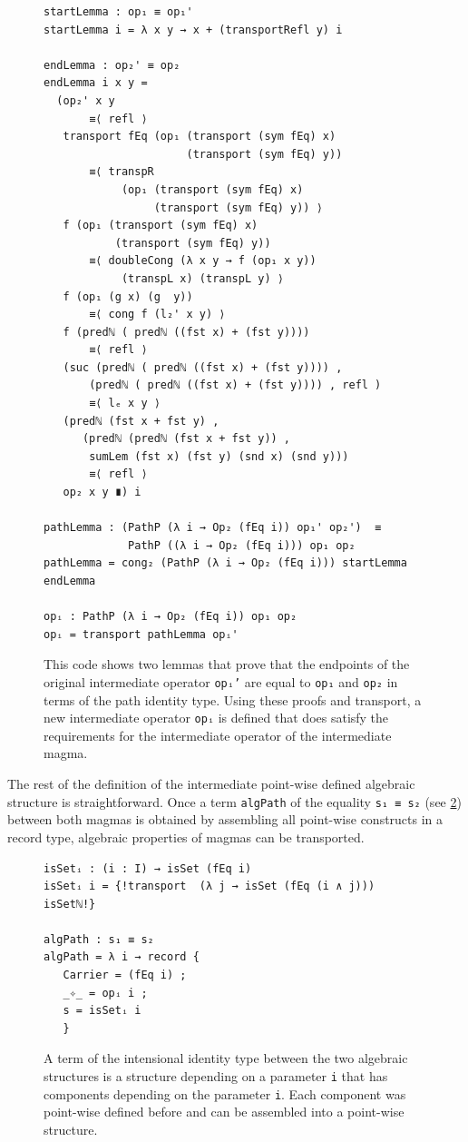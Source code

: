 \documentclass[12pt,a4paper,twoside,xetex]{book}
\begin{document}
\begin{figure}\label{adaptedOp}
 \centering
\begin{BVerbatim}
startLemma : op₁ ≡ op₁'
startLemma i = λ x y → x + (transportRefl y) i

endLemma : op₂' ≡ op₂
endLemma i x y =
  (op₂' x y
       ≡⟨ refl ⟩
   transport fEq (op₁ (transport (sym fEq) x) 
                      (transport (sym fEq) y))
       ≡⟨ transpR 
            (op₁ (transport (sym fEq) x) 
                 (transport (sym fEq) y)) ⟩
   f (op₁ (transport (sym fEq) x) 
           (transport (sym fEq) y))
       ≡⟨ doubleCong (λ x y → f (op₁ x y)) 
            (transpL x) (transpL y) ⟩
   f (op₁ (g x) (g  y))
       ≡⟨ cong f (l₂' x y) ⟩
   f (predℕ ( predℕ ((fst x) + (fst y))))
       ≡⟨ refl ⟩
   (suc (predℕ ( predℕ ((fst x) + (fst y)))) , 
       (predℕ ( predℕ ((fst x) + (fst y)))) , refl )
       ≡⟨ lₑ x y ⟩
   (predℕ (fst x + fst y) , 
      (predℕ (predℕ (fst x + fst y)) , 
       sumLem (fst x) (fst y) (snd x) (snd y)))
       ≡⟨ refl ⟩
   op₂ x y ∎) i

pathLemma : (PathP (λ i → Op₂ (fEq i)) op₁' op₂')  ≡  
             PathP ((λ i → Op₂ (fEq i))) op₁ op₂
pathLemma = cong₂ (PathP (λ i → Op₂ (fEq i))) startLemma endLemma

opᵢ : PathP (λ i → Op₂ (fEq i)) op₁ op₂
opᵢ = transport pathLemma opᵢ'
\end{BVerbatim}

\caption{This code shows two lemmas that prove that the endpoints of the original intermediate operator \texttt{opᵢ'} are equal to \texttt{op₁} and \texttt{op₂} in terms of the path identity type. Using these proofs and transport, a new intermediate operator \texttt{opᵢ} is defined that does satisfy the requirements for the intermediate operator of the intermediate magma.}   
\end{figure}

The rest of the definition of the intermediate point-wise defined algebraic structure is straightforward. Once a term \texttt{algPath} of the equality \texttt{s₁ ≡ s₂} (see \cref{algpath}) between both magmas is obtained by assembling all point-wise constructs in a record type, algebraic properties of magmas can be transported.  

\begin{figure}\label{algpath}
 \begin{BVerbatim}
isSetᵢ : (i : I) → isSet (fEq i)
isSetᵢ i = {!transport  (λ j → isSet (fEq (i ∧ j))) isSetℕ!} 

algPath : s₁ ≡ s₂
algPath = λ i → record {
   Carrier = (fEq i) ;
   _✧_ = opᵢ i ;
   s = isSetᵢ i
   }
 \end{BVerbatim}

 \caption{A term of the intensional identity type between the two algebraic structures is a structure depending on a parameter \texttt{i} that has components depending on the parameter \texttt{i}. Each component was point-wise defined before and can be assembled into a point-wise structure.}
\end{figure}
\end{document}

